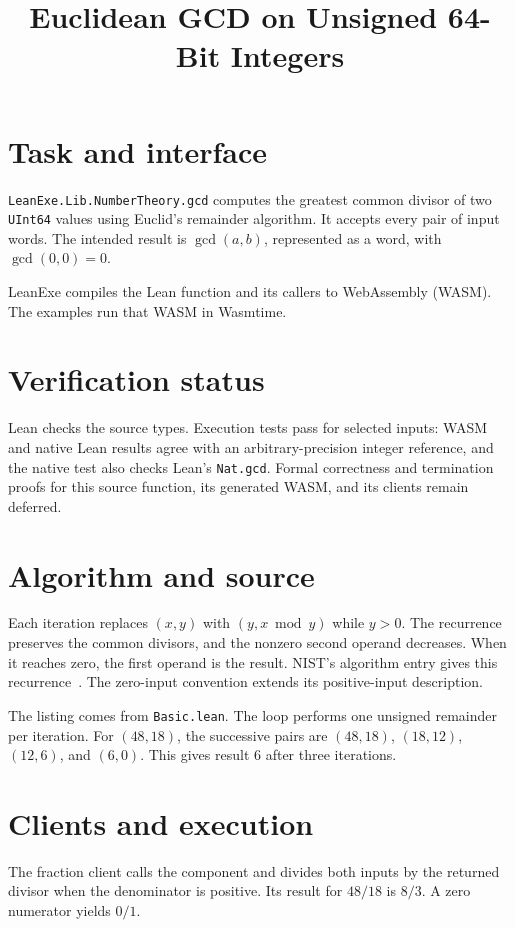
\title{Euclidean GCD on Unsigned 64-Bit Integers}

\maketitle

\section{Task and interface}
\texttt{LeanExe.Lib.NumberTheory.gcd} computes the greatest common divisor
of two \texttt{UInt64} values using Euclid's remainder algorithm.  It accepts
every pair of input words.  The intended result is $\gcd(a,b)$, represented
as a word, with $\gcd(0,0)=0$.

LeanExe compiles the Lean function and its callers to WebAssembly (WASM).
The examples run that WASM in Wasmtime.

\section{Verification status}
Lean checks the source types.  Execution tests pass for selected inputs:
WASM and native Lean results agree with an arbitrary-precision integer
reference, and the native test also checks Lean's \texttt{Nat.gcd}.
Formal correctness and termination proofs for this source function,
its generated WASM, and its clients remain deferred.

\section{Algorithm and source}
Each iteration replaces $(x,y)$ with $(y,x\bmod y)$ while $y>0$.
The recurrence preserves the common divisors, and the nonzero second operand
decreases.  When it reaches zero, the first operand is the result.  NIST's
algorithm entry gives this recurrence~\cite{euclid}.  The zero-input convention
extends its positive-input description.



The listing comes from \texttt{Basic.lean}.
The loop performs one unsigned remainder per iteration.  For $(48,18)$,
the successive pairs are $(48,18)$, $(18,12)$, $(12,6)$, and $(6,0)$.
This gives result $6$ after three iterations.

\section{Clients and execution}
The fraction client calls the component and divides both inputs by the returned
divisor when the denominator is positive.  Its result for $48/18$
is $8/3$.  A zero numerator yields $0/1$.

